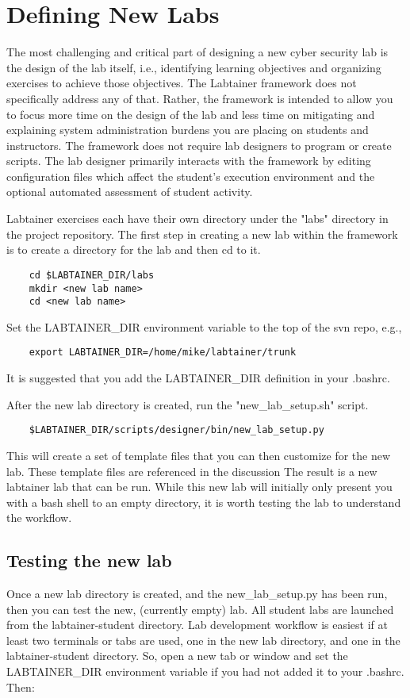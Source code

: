 \documentclass{article}
\begin{document}
\section {Defining New Labs}
\label{sec:new_labs}
The most challenging and critical part of designing a new cyber security lab
is the design of the lab itself, i.e., identifying learning objectives and
organizing exercises to achieve those objectives.  The Labtainer framework
does not specifically address any of that.  Rather, the framework is intended
to allow you to focus more time on the design of the lab and less time on mitigating and
explaining system administration burdens you are placing on students and instructors.
The framework does not require lab designers to program or create scripts.  The
lab designer primarily interacts with the framework by editing configuration files
which affect the student's execution environment and the optional automated
assessment of student activity.

Labtainer exercises each have their own
directory under the "labs" directory in the project repository.
The first step in creating a new lab within the framework is to create
a directory for the lab and then cd to it. 
\begin{verbatim}
    cd $LABTAINER_DIR/labs
    mkdir <new lab name>
    cd <new lab name>
\end{verbatim}

Set the LABTAINER\_DIR environment variable to the top of the svn repo, e.g.,
\begin{verbatim}
    export LABTAINER_DIR=/home/mike/labtainer/trunk
\end{verbatim}
It is suggested that you add the LABTAINER\_DIR definition in your .bashrc.

After the new lab directory is created, run the "new\_lab\_setup.sh" script.
\begin{verbatim}
    $LABTAINER_DIR/scripts/designer/bin/new_lab_setup.py
\end{verbatim}
This will create a set of template files that you can then customize
for the new lab.  These template files are referenced in the discussion
The result is a new labtainer lab that can be run.  While this new
lab will initially only present you with a bash shell to an
empty directory, it is worth testing the lab to understand the workflow.

\subsection{Testing the new lab}
Once a new lab directory is created, and the new\_lab\_setup.py has been run, then 
you can test the new, (currently empty) lab.  All student labs are launched from the
labtainer-student directory.  Lab development workflow is easiest if at least two
terminals or tabs are used, one in the new lab directory, and one in the labtainer-student
directory.  So, open a new tab or window and set the LABTAINER\_DIR environment variable
if you had not added it to your .bashrc.  Then:
\end{document}
